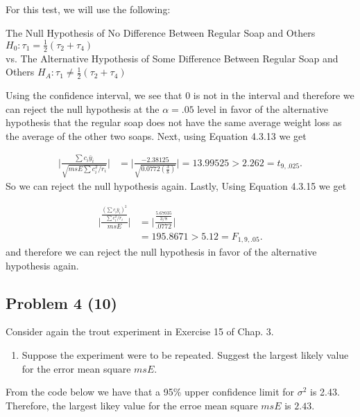 \documentclass[12pt,]{article}
\providecommand{\tightlist}{%
  \setlength{\itemsep}{0pt}\setlength{\parskip}{0pt}}
\begin{document}
For this test, we will use the following:

\begin{center}
 The Null Hypothesis of No Difference Between Regular Soap and Others  $H_0 : \tau_1 = \frac{1}{2}(\tau_2+ \tau_4)$ \\
 vs. The Alternative Hypothesis of Some Difference Between Regular Soap and Others $H_A : \tau_1 \neq \frac{1}{2}(\tau_2+ \tau_4)$
\end{center}

Using the confidence interval, we see that 0 is not in the interval and
therefore we can reject the null hypothesis at the \(\alpha=.05\) level
in favor of the alternative hypothesis that the regular soap does not
have the same average weight loss as the average of the other two soaps.
Next, using Equation 4.3.13 we get

\[
 \begin{aligned}
 \Bigg| \frac{\sum c_i \bar{y}_i}{\sqrt{msE \sum c_i^2/r_i}}  \Bigg|
 &=  \Bigg| \frac{-2.38125}{\sqrt{0.0772 \left( \frac{3}{8} \right)}}  \Bigg| = 13.99525 > 2.262 = t_{9,.025}.
  \end{aligned}
 \] So we can reject the null hypothesis again. Lastly, Using Equation
4.3.15 we get

\[
 \begin{aligned}
 \Bigg| \frac{ \frac{\left(\sum c_i \bar{y}_i\right)^2}{\sum c_i^2/r_i} }{ msE }  \Bigg|
 &=   \Bigg| \frac{ \frac{5.67035 }{3/8} }{ .0772 }  \Bigg|\\
 &=195.8671 > 5.12 = F_{1,9,.05}.
  \end{aligned}
 \] and therefore we can reject the null hypothesis in favor of the
alternative hypothesis again.

\subsection{Problem 4 (10)}\label{problem-4-10}

Consider again the trout experiment in Exercise 15 of Chap. 3.

\begin{enumerate}
\def\labelenumi{(\alph{enumi})}
\tightlist
\item
  Suppose the experiment were to be repeated. Suggest the largest likely
  value for the error mean square \(msE\).
\end{enumerate}

From the code below we have that a 95\% upper confidence limit for
\(\sigma^2\) is 2.43. Therefore, the largest likey value for the erroe
mean square \(msE\) is \(2.43\).
\end{document}
